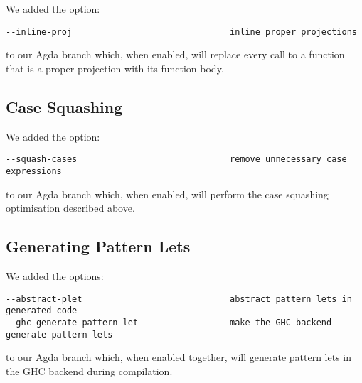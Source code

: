 We added the option:

\begin{verbatim}
--inline-proj                               inline proper projections
\end{verbatim}

to our Agda branch which, when enabled, will replace every call to a function that is a proper projection with its function body.

\subsection{Case Squashing}

We added the option:

\begin{verbatim}
--squash-cases                              remove unnecessary case expressions
\end{verbatim}

to our Agda branch which, when enabled, will perform the case squashing optimisation described above.

\subsection{Generating Pattern Lets}

We added the options:

\begin{verbatim}
--abstract-plet                             abstract pattern lets in generated code
--ghc-generate-pattern-let                  make the GHC backend generate pattern lets
\end{verbatim}

to our Agda branch which, when enabled together, will generate pattern lets in the GHC backend during compilation.
